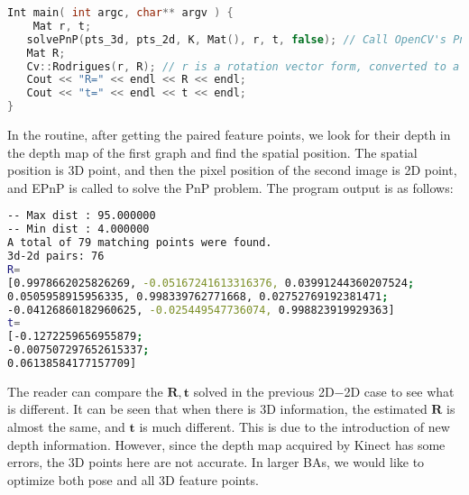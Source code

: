 \begin{lstlisting}[language=c++,caption=slambook2/ch7/pose_estimation_3d2d.cpp(fragment)]
Int main( int argc, char** argv ) {
    Mat r, t;
   solvePnP(pts_3d, pts_2d, K, Mat(), r, t, false); // Call OpenCV's PnP solution, select EPNP, DLS, etc.
   Mat R;
   Cv::Rodrigues(r, R); // r is a rotation vector form, converted to a matrix using the Rodrigues formula
   Cout << "R=" << endl << R << endl;
   Cout << "t=" << endl << t << endl;
}
\end{lstlisting}

In the routine, after getting the paired feature points, we look for their depth in the depth map of the first graph and find the spatial position. The spatial position is 3D point, and then the pixel position of the second image is 2D point, and EPnP is called to solve the PnP problem. The program output is as follows:

\begin{lstlisting}[language=sh,caption=terminal input:]
% build/pose_estimation_3d2d 1.png 2.png d1.png d2.png
-- Max dist : 95.000000
-- Min dist : 4.000000
A total of 79 matching points were found.
3d-2d pairs: 76
R=
[0.9978662025826269, -0.05167241613316376, 0.03991244360207524;
0.0505958915956335, 0.998339762771668, 0.02752769192381471;
-0.04126860182960625, -0.025449547736074, 0.998823919929363]
t=
[-0.1272259656955879;
-0.007507297652615337;
0.06138584177157709]
\end{lstlisting}

The reader can compare the $\bm{R}, \bm{t}$ solved in the previous 2D−2D case to see what is different. It can be seen that when there is 3D information, the estimated $\bm{R}$ is almost the same, and $\bm{t}$ is much different. This is due to the introduction of new depth information. However, since the depth map acquired by Kinect has some errors, the 3D points here are not accurate. In larger BAs, we would like to optimize both pose and all 3D feature points.


